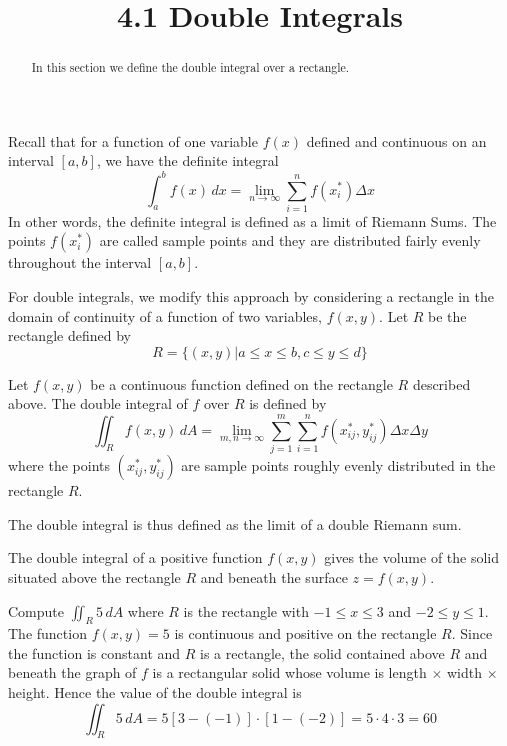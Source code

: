 \documentclass[handout]{ximera}
\title{4.1 Double Integrals}
\begin{document}
\begin{abstract}
In this section we define the double integral over a rectangle.
\end{abstract}
 
\maketitle


Recall that for a function of one variable $f(x)$ defined and continuous on an interval $[a,b]$, we have the definite integral
\[
\int_a^b f(x) \, dx = \lim_{n \to \infty} \sum_{i = 1}^n f(x_i^*) \Delta x
\]
In other words, the definite integral is defined as a limit of Riemann Sums.  The points $f(x_i^*)$ are called sample points and they are 
distributed fairly evenly throughout the interval $[a,b]$.

For double integrals, we modify this approach by considering a rectangle in the domain of continuity of a function of two variables, $f(x,y)$.
Let $R$ be the rectangle defined by
\[
R = \{(x,y) | a\leq x \leq b, c\leq y \leq d\}
\]

\begin{definition}
Let $f(x,y)$ be a continuous function defined on the rectangle $R$ described above. The double integral of $f$ over $R$ is defined by
\[
\iint_R f(x,y) \, dA = \lim_{m, n \to \infty} \sum_{j = 1}^m\sum_{i = 1}^n f(x_{ij}^*, y_{ij}^*) \Delta x \Delta y
\]
where the points $(x_{ij}^*, y_{ij}^*)$ are sample points roughly evenly distributed in the rectangle $R$.
\end{definition}

The double integral is thus defined as the limit of a double Riemann sum.

\begin{remark}
The double integral of a positive function $f(x,y)$ gives the volume of the solid situated above the rectangle $R$ and beneath the surface $z = f(x,y)$.
\end{remark}


\begin{example}[Example 1]
Compute $\iint_R 5 \, dA$ where $R$ is the rectangle with $-1 \leq x \leq 3$ and $-2 \leq y \leq 1$.\\
The function $f(x,y) = 5$ is continuous and positive on the rectangle $R$.  Since the function is constant and $R$ is a rectangle, the solid contained above $R$
and beneath the graph of $f$ is a rectangular solid whose volume is length $\times$ width $\times$ height.
Hence the value of the double integral is
\[
\iint_R 5 \, dA = 5[3-(-1)] \cdot [1-(-2)] = 5 \cdot 4 \cdot 3 = 60
\]
\end{example}
\end{document}
